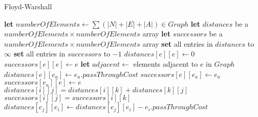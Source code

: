 \begin{algorithm}
\caption{Floyd-Warshall}\label{floyd-warshall}
\begin{algorithmic}[1]

	\State \textbf{let} $numberOfElements \leftarrow \sum (|N|+|E|+|A|) \in Graph$
	\State \textbf{let} $distances$ be a $numberOfElements \times numberOfElements$ array
	\State \textbf{let} $successors$ be a $numberOfElements \times numberOfElements$ array
	\State \textbf{set} all entries in $distances$ to $\infty$
	\State \textbf{set} all entries in $successors$ to $-1$
		\State $distances[e][e] \leftarrow 0$
		\State $successors[e][e] \leftarrow e$
	\EndFor
		\State \textbf{let} $adjacent \leftarrow $ elements adjacent to $e$ in $Graph$
			\State $distances[e][e_a] \leftarrow e_a.passThroughCost$
			\State $successors[e][e_a] \leftarrow e_a$
			\State $successors[e_a][e] \leftarrow e$
		\EndFor
	\EndFor
					\State $distances[i][j] = distances[i][k] + distances[k][j]$
					\State $successors[i][j] = successors[i][k]$
				\EndIf
			\EndFor
		\EndFor
	\EndFor
			\State $distances[e_j][e_i] \leftarrow distances[e_j][e_i] - e_i.passThroughCost$
		\EndIf
	\EndFor
\EndProcedure

\end{algorithmic}
\end{algorithm}


